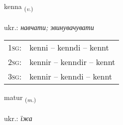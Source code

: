 \documentclass[frontgrid, backgrid]{flacards}\usepackage[]{graphicx}\usepackage[]{xcolor}
\begin{document}
\renewcommand{\flhead}{\vskip5pt \fboxsep=0pt {\small\bfseries\footnotesize Sagnorð | дієслово}}
\renewcommand{\fcfoot}{\vskip5pt \fboxsep=0pt \hspace{2pt}{\small\bfseries\footnotesize 1K}}

\renewcommand{\blhead}{\vskip5pt {\small\bfseries\footnotesize Sagnorð | дієслово }}
\renewcommand{\bcfoot}{\vskip5pt \hspace{2pt}{\small\bfseries\footnotesize 1K}}


{kenna \small{\textsubscript{(\textit{v.})}} \\[1ex] %
\textphonetic{[cʰɛna]} \\
ukr.: \emph{навчати; звинувачувати} \\  [2ex]
\renewcommand*{\arraystretch}{0.8}
\begin{tabular}{p{1cm}l}
\textsc{1sg}: & kenni -- kenndi -- kennt \\ 
\textsc{2sg}: & kennir -- kenndir -- kennt \\ 
\textsc{3sg}: & kennir -- kenndi -- kennt \\ 
\end{tabular}
}

\renewcommand{\flhead}{\vskip5pt \fboxsep=0pt {\small\bfseries\footnotesize Nafnorð | іменник}}
\renewcommand{\fcfoot}{\vskip5pt \fboxsep=0pt \hspace{2pt}{\small\bfseries\footnotesize 1K}}

\renewcommand{\blhead}{\vskip5pt {\small\bfseries\footnotesize Nafnorð | іменник }}
\renewcommand{\bcfoot}{\vskip5pt \hspace{2pt}{\small\bfseries\footnotesize 1K}}


{matur \small{\textsubscript{(\textit{m.})}} \\[1ex] %
\textphonetic{[maːtʏr]} \\
ukr.: \emph{їжа} \\  [2ex]
\renewcommand*{\arraystretch}{0.8}
}
\end{document}
